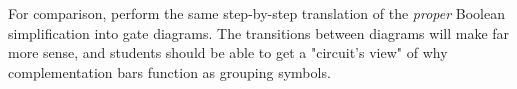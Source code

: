 For comparison, perform the same step-by-step translation of the {\it proper} Boolean simplification into gate diagrams.  The transitions between diagrams will make far more sense, and students should be able to get a "circuit's view" of why complementation bars function as grouping symbols.




